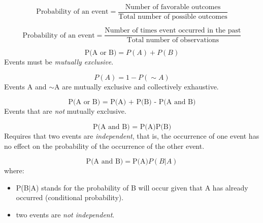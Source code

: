 \begin{equation}
\label{classical probability}
\text{Probability of an event} = \frac{\text{Number of favorable outcomes}}{\text{Total number of possible outcomes}}
\end{equation}
\hformbar


\begin{equation}
\label{empirical probability}
\text{Probability of an event} = \frac{\text{Number of times event occurred in the past}}{\text{Total number of observations}}
\end{equation}
\hformbar


\begin{equation}
\label{special rule of addition}
\text{P(A or B)} = P(A) + P(B)
\end{equation}
Events must be \emph{mutually exclusive}.
\hformbar


\begin{equation}
\label{complement rule}
P(A) = 1 - P(\sim A)
\end{equation}
Events A and $\sim$A are mutually exclusive and collectively exhaustive.
\hformbar


\begin{equation}
\label{general rule of addition}
\text{P(A or B) = P(A) + P(B) - P(A and B)}
\end{equation}
Events that are \emph{not} mutually exclusive.
\hformbar


\begin{equation}
\label{special rule of multiplication}
\text{P(A and B) = P(A)P(B)}
\end{equation}
Requires that two events are \emph{independent}, that is, the occurrence of one event has no effect on the probability of the occurrence of the other event.
\hformbar


\begin{equation}
\label{general rule of multiplication}
\text{P(A and B)} = \text{P(A)}P(B \vert A)
\end{equation}
where: 
\begin{itemize}
 \item P(B$\vert$A) stands for the probability of B will occur given that A has already occurred (conditional probability).
 \item two events are \emph{not independent}.
\end{itemize} 
\hformbar


